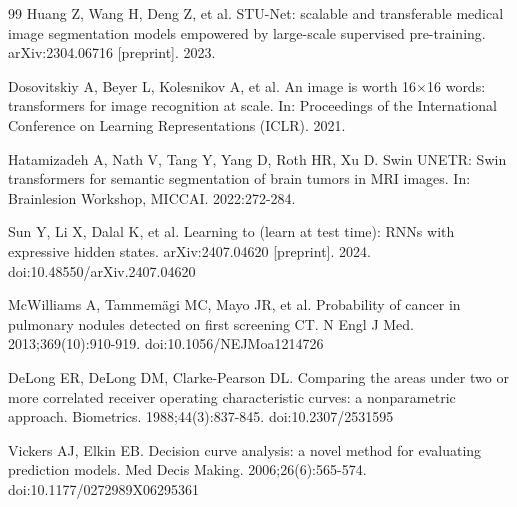 \documentclass[11pt]{article}
\begin{document}
\begin{thebibliography}{99}
Huang Z, Wang H, Deng Z, et al. STU-Net: scalable and transferable medical image segmentation models empowered by large-scale supervised pre-training. arXiv:2304.06716 [preprint]. 2023.

Dosovitskiy A, Beyer L, Kolesnikov A, et al. An image is worth 16$\times$16 words: transformers for image recognition at scale. In: Proceedings of the International Conference on Learning Representations (ICLR). 2021.

Hatamizadeh A, Nath V, Tang Y, Yang D, Roth HR, Xu D. Swin UNETR: Swin transformers for semantic segmentation of brain tumors in MRI images. In: Brainlesion Workshop, MICCAI. 2022:272-284.

Sun Y, Li X, Dalal K, et al. Learning to (learn at test time): RNNs with expressive hidden states. arXiv:2407.04620 [preprint]. 2024. doi:10.48550/arXiv.2407.04620

McWilliams A, Tammem\"agi MC, Mayo JR, et al. Probability of cancer in pulmonary nodules detected on first screening CT. N Engl J Med. 2013;369(10):910-919. doi:10.1056/NEJMoa1214726

DeLong ER, DeLong DM, Clarke-Pearson DL. Comparing the areas under two or more correlated receiver operating characteristic curves: a nonparametric approach. Biometrics. 1988;44(3):837-845. doi:10.2307/2531595

Vickers AJ, Elkin EB. Decision curve analysis: a novel method for evaluating prediction models. Med Decis Making. 2006;26(6):565-574. doi:10.1177/0272989X06295361

\end{thebibliography}
\end{document}
